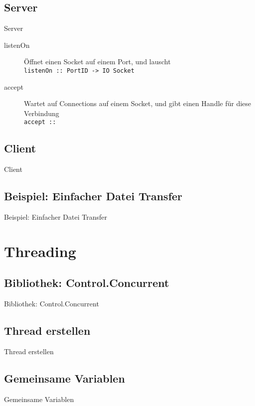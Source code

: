 \documentclass{beamer}
\begin{document}
\subsection{Server}
\begin{frame}{Server}
\begin{description}
\item[listenOn] Öffnet einen Socket auf einem Port, und lauscht \\ \texttt{listenOn :: PortID -> IO Socket}
\item[accept] Wartet auf Connections auf einem Socket, und gibt einen Handle für diese Verbindung \\ \texttt{accept :: }
\end{description}
\end{frame}

\subsection{Client}
\begin{frame}{Client}
\end{frame}

\subsection{Beispiel: Einfacher Datei Transfer}
\begin{frame}{Beispiel: Einfacher Datei Transfer}
\end{frame}

\section{Threading}
\subsection{Bibliothek: Control.Concurrent}
\begin{frame}{Bibliothek: Control.Concurrent}
\end{frame}

\subsection{Thread erstellen}
\begin{frame}{Thread erstellen}
\end{frame}

\subsection{Gemeinsame Variablen}
\begin{frame}{Gemeinsame Variablen}
\end{frame}
\end{document}
